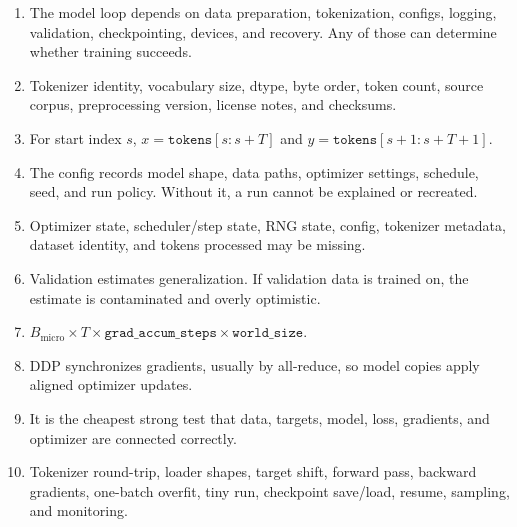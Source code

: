 \begin{enumerate}
  \item The model loop depends on data preparation, tokenization, configs, logging, validation, checkpointing, devices, and recovery. Any of those can determine whether training succeeds.
  \item Tokenizer identity, vocabulary size, dtype, byte order, token count, source corpus, preprocessing version, license notes, and checksums.
  \item For start index \(s\), \(x=\texttt{tokens}[s:s+T]\) and \(y=\texttt{tokens}[s+1:s+T+1]\).
  \item The config records model shape, data paths, optimizer settings, schedule, seed, and run policy. Without it, a run cannot be explained or recreated.
  \item Optimizer state, scheduler/step state, RNG state, config, tokenizer metadata, dataset identity, and tokens processed may be missing.
  \item Validation estimates generalization. If validation data is trained on, the estimate is contaminated and overly optimistic.
  \item \(B_{\text{micro}}\times T\times \texttt{grad\_accum\_steps}\times \texttt{world\_size}\).
  \item DDP synchronizes gradients, usually by all-reduce, so model copies apply aligned optimizer updates.
  \item It is the cheapest strong test that data, targets, model, loss, gradients, and optimizer are connected correctly.
  \item Tokenizer round-trip, loader shapes, target shift, forward pass, backward gradients, one-batch overfit, tiny run, checkpoint save/load, resume, sampling, and monitoring.
\end{enumerate}
